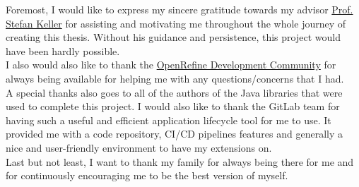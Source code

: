 Foremost, I would like to express my sincere gratitude towards my advisor \href{mailto:stefan.keller@ost.ch}{Prof. Stefan Keller} for assisting and motivating me throughout the whole journey of creating this thesis. Without his guidance and persistence, this project would have been hardly possible.\\
\newline
I also would also like to thank the \href{https://groups.google.com/g/openrefine-dev}{OpenRefine Development Community} for always being available for helping me with any questions/concerns that I had.\\
\newline
A special thanks also goes to all of the authors of the Java libraries that were used to complete this project. I would also like to thank the GitLab team for having such a useful and efficient application lifecycle tool for me to use. It provided me with a code repository, CI/CD pipelines features and generally a nice and user-friendly environment to have my extensions on.\\
\newline
Last but not least, I want to thank my family for always being there for me and for continuously encouraging me to be the best version of myself.
